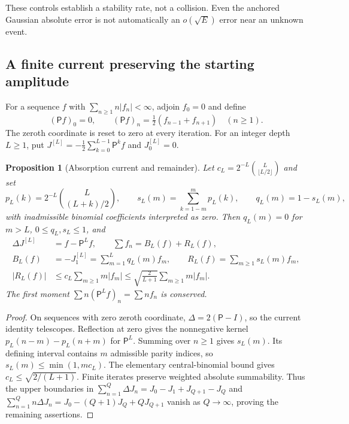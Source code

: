 \documentclass[11pt]{article}
\numberwithin{equation}{section}
\newtheorem{proposition}[theorem]{Proposition}
\theoremstyle{definition}
\theoremstyle{remark}
\begin{document}
These controls establish a stability rate, not a collision.
Even the anchored Gaussian absolute error is not automatically
an $o(\sqrt E)$ error near an unknown event.

\subsection{A finite current preserving the starting amplitude}

For a sequence $f$ with $\sum_{n\ge1}n|f_n|<\infty$, adjoin $f_0=0$
and define
\[
 (\mathsf Pf)_0=0,\qquad
 (\mathsf Pf)_n=\tfrac12(f_{n-1}+f_{n+1})\quad(n\ge1).
\]
The zeroth coordinate is reset to zero at every iteration.
For an integer depth $L\ge1$, put
$J^{[L]}=-\frac12\sum_{k=0}^{L-1}\mathsf P^kf$ and $J^{[L]}_0=0$.

\begin{proposition}[Absorption current and remainder]
\label{adj:absorption-current}
Let $c_L=2^{-L}\binom L{\lfloor L/2\rfloor}$ and set
\[
 p_L(k)=2^{-L}\binom L{(L+k)/2},\qquad
 s_L(m)=\sum_{k=1-m}^{m}p_L(k),\qquad q_L(m)=1-s_L(m),
\]
with inadmissible binomial coefficients interpreted as zero.
Then $q_L(m)=0$ for $m>L$, $0\le q_L,s_L\le1$, and
\begin{align}
 \Delta J^{[L]}&=f-\mathsf P^Lf,\qquad
 \sum f_n=B_L(f)+R_L(f), \label{adj:current-identity}\\
 B_L(f)&=-J^{[L]}_1=\sum_{m=1}^Lq_L(m)f_m,\qquad
 R_L(f)=\sum_{m\ge1}s_L(m)f_m, \label{adj:current-weights}\\
 |R_L(f)|&\le c_L\sum_{m\ge1}m|f_m|
 \le\sqrt{\frac2{L+1}}\sum_{m\ge1}m|f_m|.
 \label{adj:current-error}
\end{align}
The first moment $\sum n(\mathsf P^Lf)_n=\sum nf_n$ is conserved.
\end{proposition}
\begin{proof}
On sequences with zero zeroth coordinate, $\Delta=2(\mathsf P-I)$,
so the current identity telescopes.
Reflection at zero gives the nonnegative kernel
$p_L(n-m)-p_L(n+m)$ for $\mathsf P^L$.
Summing over $n\ge1$ gives $s_L(m)$.
Its defining interval contains $m$ admissible parity indices, so
$s_L(m)\le\min(1,mc_L)$.
The elementary central-binomial bound gives
$c_L\le\sqrt{2/(L+1)}$.
Finite iterates preserve weighted absolute summability.
Thus the upper boundaries in
$\sum_{n=1}^Q\Delta J_n=J_0-J_1+J_{Q+1}-J_Q$
and
$\sum_{n=1}^Q n\Delta J_n=J_0-(Q+1)J_Q+QJ_{Q+1}$
vanish as $Q\to\infty$, proving the remaining assertions.
\end{proof}
\end{document}
